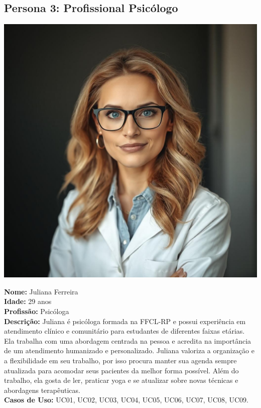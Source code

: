 \documentclass[a4paper,12pt]{report}
\begin{document}
\vspace{1cm} %

\subsection{Persona 3: Profissional Psicólogo}
\begin{minipage}{0.3\textwidth}
    \centering
    \includegraphics[width=1.0\textwidth]{fotor-ai-20240915203048.jpg}
\end{minipage}
\hfill
\begin{minipage}{0.65\textwidth}
    \textbf{Nome:} Juliana Ferreira \\
    \textbf{Idade:} 29 anos \\
    \textbf{Profissão:} Psicóloga \\
    \textbf{Descrição:} Juliana é psicóloga formada na FFCL-RP e possui experiência em atendimento clínico e comunitário para estudantes de diferentes faixas etárias. Ela trabalha com uma abordagem centrada na pessoa e acredita na importância de um atendimento humanizado e personalizado. Juliana valoriza a organização e a flexibilidade em seu trabalho, por isso procura manter sua agenda sempre atualizada para acomodar seus pacientes da melhor forma possível. Além do trabalho, ela gosta de ler, praticar yoga e se atualizar sobre novas técnicas e abordagens terapêuticas.\\
    \textbf{Casos de Uso:} UC01, UC02, UC03, UC04, UC05, UC06, UC07, UC08, UC09.
\end{minipage}
\end{document}
